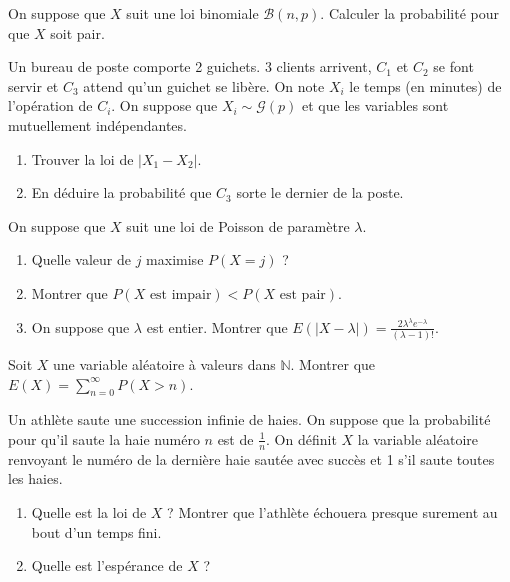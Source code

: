 \begin{exercice}
On suppose que $X$ suit une loi binomiale $\mathcal{B}(n,p)$. Calculer la probabilité pour que $X$ soit pair.
\end{exercice}

\begin{exercice}
Un bureau de poste comporte 2 guichets. 3 clients arrivent, $C_{1}$ et $C_{2}$ se font servir et $C_{3}$ attend qu'un guichet se libère. On note $X_{i}$ le temps (en minutes) de l'opération de $C_{i}$. On suppose que $X_{i}\sim\mathcal{G}(p)$ et que les variables sont mutuellement indépendantes.
\begin{enumerate}
    \item Trouver la loi de $|X_{1}-X_{2}|$.
    \item En déduire la probabilité que $C_{3}$ sorte le dernier de la poste.
\end{enumerate}
\end{exercice}

\begin{exercice}
On suppose que $X$ suit une loi de Poisson de paramètre $\lambda$.
\begin{enumerate}
    \item Quelle valeur de $j$ maximise $P(X=j)$ ?
    \item Montrer que $P(X \text{ est impair}) < P(X \text{ est pair})$.
    \item On suppose que $\lambda$ est entier. Montrer que $E(|X-\lambda|)=\frac{2\lambda^{\lambda}e^{-\lambda}}{(\lambda-1)!}$.
\end{enumerate}
\end{exercice}

\begin{exercice}
Soit $X$ une variable aléatoire à valeurs dans $\mathbb{N}$. Montrer que $E(X)=\sum_{n=0}^{\infty}P(X>n)$.
\end{exercice}

\begin{exercice}
Un athlète saute une succession infinie de haies. On suppose que la probabilité pour qu'il saute la haie numéro $n$ est de $\frac{1}{n}$. On définit $X$ la variable aléatoire renvoyant le numéro de la dernière haie sautée avec succès et 1 s'il saute toutes les haies.
\begin{enumerate}
    \item Quelle est la loi de $X$ ? Montrer que l'athlète échouera presque surement au bout d'un temps fini.
    \item Quelle est l'espérance de $X$ ?
\end{enumerate}
\end{exercice}

